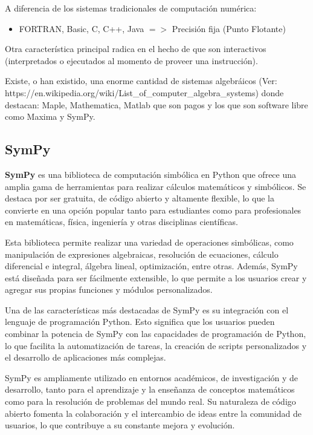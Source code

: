 \documentclass[11pt]{article}
\providecommand{\tightlist}{%
      \setlength{\itemsep}{0pt}\setlength{\parskip}{0pt}}
\begin{document}
A diferencia de los sistemas tradicionales de computación numérica:

\begin{itemize}
\tightlist
\item
  FORTRAN, Basic, C, C++, Java \(=>\) Precisión fija (Punto Flotante)
\end{itemize}

Otra característica principal radica en el hecho de que son interactivos
(interpretados o ejecutados al momento de proveer una instrucción).

Existe, o han existido, una enorme cantidad de sistemas algebráicos
(Ver:
https://en.wikipedia.org/wiki/List\_of\_computer\_algebra\_systems)
donde destacan: Maple, Mathematica, Matlab que son pagos y los que son
software libre como Maxima y SymPy.

    \hypertarget{sympy}{%
\subsection{SymPy}\label{sympy}}

\textbf{SymPy} es una biblioteca de computación simbólica en Python que
ofrece una amplia gama de herramientas para realizar cálculos
matemáticos y simbólicos. Se destaca por ser gratuita, de código abierto
y altamente flexible, lo que la convierte en una opción popular tanto
para estudiantes como para profesionales en matemáticas, física,
ingeniería y otras disciplinas científicas.

Esta biblioteca permite realizar una variedad de operaciones simbólicas,
como manipulación de expresiones algebraicas, resolución de ecuaciones,
cálculo diferencial e integral, álgebra lineal, optimización, entre
otras. Además, SymPy está diseñada para ser fácilmente extensible, lo
que permite a los usuarios crear y agregar sus propias funciones y
módulos personalizados.

Una de las características más destacadas de SymPy es su integración con
el lenguaje de programación Python. Esto significa que los usuarios
pueden combinar la potencia de SymPy con las capacidades de programación
de Python, lo que facilita la automatización de tareas, la creación de
scripts personalizados y el desarrollo de aplicaciones más complejas.

SymPy es ampliamente utilizado en entornos académicos, de investigación
y de desarrollo, tanto para el aprendizaje y la enseñanza de conceptos
matemáticos como para la resolución de problemas del mundo real. Su
naturaleza de código abierto fomenta la colaboración y el intercambio de
ideas entre la comunidad de usuarios, lo que contribuye a su constante
mejora y evolución.
\end{document}
